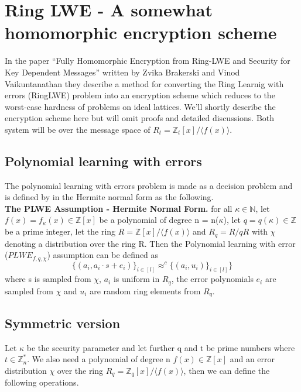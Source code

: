 \documentclass[../main.tex]{subfiles}
\begin{document}
    \section{Ring LWE - A somewhat homomorphic encryption scheme} \label{section: RLWE theory}
    In the paper ``Fully Homomorphic Encryption from Ring-LWE and Security for Key Dependent Messages'' written by
    Zvika Brakerski and Vinod Vaikuntanathan \cite{brakerski2011fully}
    they describe a method for converting the Ring Learnig with errors (RingLWE) problem into an encryption scheme
    which reduces to the worst-case hardness of problems on ideal lattices.
    We'll shortly describe the encryption scheme here but will omit proofs and detailed discussions.
    Both system will be over the message space of $R_t = \mathbb{Z}_t[x] / \langle f(x) \rangle $.

    \subsection{Polynomial learning with errors}
    The polynomial learning with errors problem is made as a decision problem
    and is defined by in the Hermite normal form as the following.
    \\[2mm]
    \textbf{The PLWE Assumption - Hermite Normal Form.}
    for all $\kappa \in \mathbb{N}$, let $f(x) = f_{\kappa}(x) \in \mathbb{Z}[x]$
    be a polynomial of degree n = n($\kappa$), let $q = q(\kappa) \in \mathbb{Z}$
    be a prime integer, let the ring $R = \mathbb{Z}[x] / \langle f(x) \rangle$
    and $R_q = R / qR$ with $\chi$ denoting a distribution over the ring R. 
    Then the Polynomial learning with error ($PLWE_{f,q,\chi}$) assumption can be defined as
    $$
        \{ (a_i, a_i \cdot s + e_i) \}_{i \in [l]} \approx^{c} \{(a_i, u_i) \}_{i \in [l]}\}
    $$
    where s is sampled from $\chi$, $a_i$ is uniform in $R_q$, the error polynomials
    $e_i$ are sampled from $\chi$ and $u_i$ are random ring elements from $R_q$.

    \subsection{Symmetric version}
    Let $\kappa$ be the security parameter and let further q and t be prime numbers where $t \in \mathbb{Z}_n^*$.
    We also need a polynomial of degree n $f(x) \in \mathbb{Z}[x]$ and an error distribution $\chi$ over the ring
    $R_q = \mathbb{Z}_q[x] / \langle f(x) \rangle$, then we can define the following operations.
\end{document}

